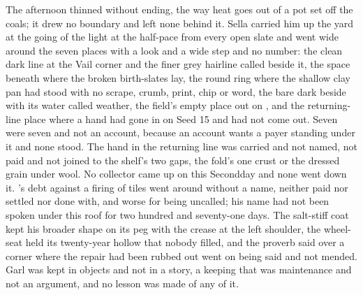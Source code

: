 The afternoon thinned without ending, the way heat goes out of a pot set off the coals; it drew no boundary and left none behind it. Sella carried him up the yard at the going of the light at the half-pace from every open slate and went wide around the seven places with a look and a wide step and no number: the clean dark line at the Vail corner and the finer grey hairline called  beside it, the space beneath  where the broken birth-slates lay, the round ring where the shallow clay pan had stood with no scrape, crumb, print, chip or word, the bare dark  beside  with its water called weather, the field's empty place out on , and the returning-line place where a hand had gone in on Seed 15 and had not come out. Seven were seven and not an account, because an account wants a payer standing under it and none stood. The hand in the returning line was carried and not named, not paid and not joined to the shelf's two gaps, the fold's one crust or the dressed grain under wool. No collector came up  on this Secondday and none went down it. 's debt against a firing of tiles went around without a name, neither paid nor settled nor done with, and worse for being uncalled; his name had not been spoken under this roof for two hundred and seventy-one days. The salt-stiff coat kept his broader shape on its peg with the crease at the left shoulder, the wheel-seat held its twenty-year hollow that nobody filled, and the proverb said over a corner where the repair had been rubbed out went on being said and not mended. Garl was kept in objects and not in a story, a keeping that was maintenance and not an argument, and no lesson was made of any of it.

